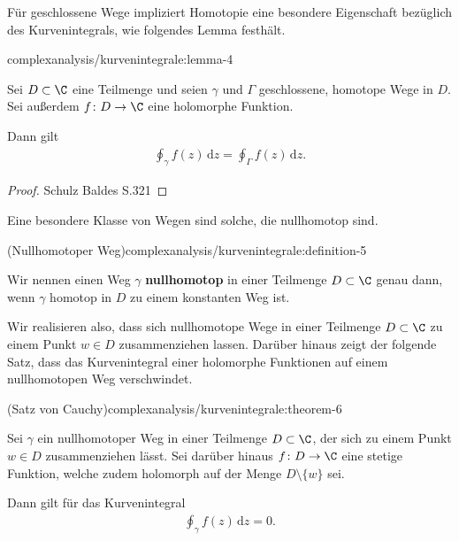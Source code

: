 \documentclass[letterpaper,10pt,german]{jupyterBook}
\begin{document}
\par
Für geschlossene Wege impliziert Homotopie eine besondere Eigenschaft bezüglich des Kurvenintegrals, wie folgendes Lemma festhält.
\begin{lemma}{}{complexanalysis/kurvenintegrale:lemma-4}



\par
Sei \(D \subset \C\) eine Teilmenge und seien \(\gamma\) und \(\Gamma\) geschlossene, homotope Wege in \(D\).
Sei außerdem \(f \colon D \rightarrow \C\) eine holomorphe Funktion.

\par
Dann gilt
\begin{align*}
\oint_\gamma f(z) \, \mathrm{d}z = \oint_\Gamma f(z) \, \mathrm{d}z.
\end{align*}\end{lemma}

\begin{proof}
 Schulz Baldes S.321
\end{proof}

\par
Eine besondere Klasse von Wegen sind solche, die nullhomotop sind.
\begin{definition}{(Nullhomotoper Weg)}{complexanalysis/kurvenintegrale:definition-5}



\par
Wir nennen einen Weg \(\gamma\) \textbf{nullhomotop} in einer Teilmenge \(D \subset \C\) genau dann, wenn \(\gamma\) homotop in \(D\) zu einem konstanten Weg ist.
\end{definition}

\par
Wir realisieren also, dass sich nullhomotope Wege in einer Teilmenge \(D \subset \C\) zu einem Punkt \(w \in D\) zusammenziehen lassen.
Darüber hinaus zeigt der folgende Satz, dass das Kurvenintegral einer holomorphe Funktionen auf einem nullhomotopen Weg verschwindet.
\begin{theorem}{(Satz von Cauchy)}{complexanalysis/kurvenintegrale:theorem-6}



\par
Sei \(\gamma\) ein nullhomotoper Weg in einer Teilmenge \(D \subset \C\), der sich zu einem Punkt \(w \in D\) zusammenziehen lässt.
Sei darüber hinaus \(f \colon D \rightarrow \C\) eine stetige Funktion, welche zudem holomorph auf der Menge \(D \setminus \{w\}\) sei.

\par
Dann gilt für das Kurvenintegral
\begin{align*}
\oint_\gamma f(z) \, \mathrm{d}z = 0.
\end{align*}\end{theorem}
\end{document}
